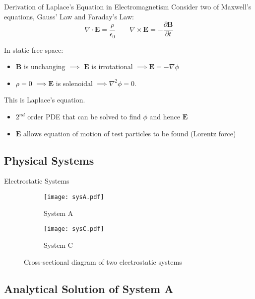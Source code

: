 \documentclass{beamer}
\newcommand{\be}{\begin{equation}}
\newcommand{\ee}{\end{equation}}
\begin{document}
\begin{frame}{Derivation of Laplace's Equation in Electromagnetism}
Consider two of Maxwell's equations, Gauss' Law and Faraday's Law:
%
\be
\nabla \cdot \bm{E} = \frac{\rho}{\epsilon_0} \qquad \nabla \times \bm{E} = -\frac{\partial \bm{B}}{\partial t}
\ee

In static free space:
\begin{itemize}
 \item $\bm{B}$ is unchanging $\implies$ $\bm{E}$ is irrotational $\implies \bm{E} = -\nabla \phi$
 \item $\rho=0$ $\implies \bm{E}$ is solenoidal $\implies \nabla^2 \phi = 0$.
\end{itemize}

This is Laplace's equation.
\begin{itemize}
 \item $2^{nd}$ order PDE that can be solved to find $\phi$ and hence $\bm{E}$
 \item $\bm{E}$ allows equation of motion of test particles to be found (Lorentz force)
\end{itemize}
\end{frame}

\subsection{Physical Systems}

\begin{frame}{Electrostatic Systems}
\begin{figure}
\centering
\begin{subfigure}[b]{0.45\textwidth}
	\centerline{\texttt{[image: sysA.pdf]}}
	\caption{System A}
\end{subfigure}
\hfill
\begin{subfigure}[b]{0.45\textwidth}
	\centerline{\texttt{[image: sysC.pdf]}}
	\caption{System C}
\end{subfigure}
\caption{Cross-sectional diagram of two electrostatic systems}
\end{figure}

\end{frame}

\subsection{Analytical Solution of System A}
\end{document}
